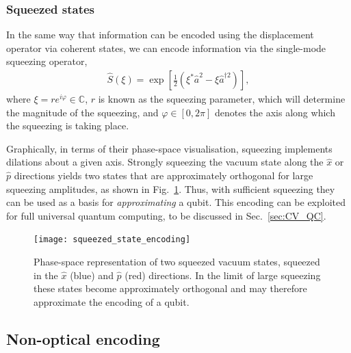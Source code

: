 %
%

\subsubsection{Squeezed states}\label{sec:squeezed_enc}

In the same way that information can be encoded using the displacement operator via coherent states, we can encode information via the single-mode squeezing operator,
\begin{align}\label{eq:sq_op}
\hat{S}(\xi) = \exp\left[ \frac{1}{2}(\xi^*\hat{a}^2 - \xi{\hat{a}^{\dag 2}})\right],
\end{align}
where \mbox{$\xi  = r e^{i \varphi}\in \mathbb{C}$}, $r$ is known as the squeezing parameter, which will determine the magnitude of the squeezing, and \mbox{$\varphi \in [0, 2\pi]$} denotes the axis along which the squeezing is taking place.

Graphically, in terms of their phase-space visualisation, squeezing implements dilations about a given axis. Strongly squeezing the vacuum state along the $\hat{x}$ or $\hat{p}$ directions yields two states that are approximately orthogonal for large squeezing amplitudes, as shown in Fig.~\ref{fig:squeezed_state_encoding}. Thus, with sufficient squeezing they can be used as a basis for \textit{approximating} a qubit. This encoding can be exploited for full universal quantum computing, to be discussed in Sec.~\ref{sec:CV_QC}.

\begin{figure}[!htbp]
\texttt{[image: squeezed\_state\_encoding]}
\captionspacefig \caption{Phase-space representation of two squeezed vacuum states, squeezed in the $\hat{x}$ (blue) and $\hat{p}$ (red) directions. In the limit of large squeezing these states become approximately orthogonal and may therefore approximate the encoding of a qubit.} \label{fig:squeezed_state_encoding}
\end{figure}

%
%

\subsection{Non-optical encoding}

